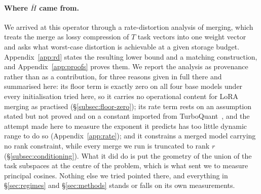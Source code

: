 \paragraph{Where $\bar H$ came from.} We arrived at this operator through a
rate-distortion analysis of merging, which treats the merge as lossy
compression of $T$ task vectors into one weight vector and asks what worst-case
distortion is achievable at a given storage budget. Appendix~\ref{app:rd}
states the resulting lower bound and a matching construction, and
Appendix~\ref{app:proofs} proves them. We report the analysis as provenance
rather than as a contribution, for three reasons given in full there and
summarised here: its floor term is exactly zero on all four base models under
every initialisation tried here, so it carries no operational content for LoRA
merging as practised (\S\ref{subsec:floor-zero}); its rate term rests on an
assumption stated but not proved and on a constant imported from
TurboQuant~\citep{zandieh2025turboquant}, and the attempt made here to measure
the exponent it predicts has too little dynamic range to do so
(Appendix~\ref{app:rate}); and it constrains a merged model carrying no rank
constraint, while every merge we run is truncated to rank $r$
(\S\ref{subsec:conditioning}). What it did do is put the geometry of the union
of the task subspaces at the centre of the problem, which is what sent we to
measure principal cosines. Nothing else we tried pointed there, and everything
in \S\ref{sec:regimes} and \S\ref{sec:methods} stands or falls on its own
measurements.
